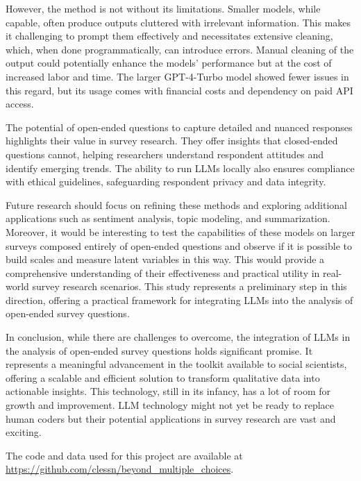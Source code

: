 \documentclass[
  authoryear,
  preprint,
  3p]{elsarticle}
\begin{document}
However, the method is not without its limitations. Smaller models,
while capable, often produce outputs cluttered with irrelevant
information. This makes it challenging to prompt them effectively and
necessitates extensive cleaning, which, when done programmatically, can
introduce errors. Manual cleaning of the output could potentially
enhance the models' performance but at the cost of increased labor and
time. The larger GPT-4-Turbo model showed fewer issues in this regard,
but its usage comes with financial costs and dependency on paid API
access.

The potential of open-ended questions to capture detailed and nuanced
responses highlights their value in survey research. They offer insights
that closed-ended questions cannot, helping researchers understand
respondent attitudes and identify emerging trends. The ability to run
LLMs locally also ensures compliance with ethical guidelines,
safeguarding respondent privacy and data integrity.

Future research should focus on refining these methods and exploring
additional applications such as sentiment analysis, topic modeling, and
summarization. Moreover, it would be interesting to test the
capabilities of these models on larger surveys composed entirely of
open-ended questions and observe if it is possible to build scales and
measure latent variables in this way. This would provide a comprehensive
understanding of their effectiveness and practical utility in real-world
survey research scenarios. This study represents a preliminary step in
this direction, offering a practical framework for integrating LLMs into
the analysis of open-ended survey questions.

In conclusion, while there are challenges to overcome, the integration
of LLMs in the analysis of open-ended survey questions holds significant
promise. It represents a meaningful advancement in the toolkit available
to social scientists, offering a scalable and efficient solution to
transform qualitative data into actionable insights. This technology,
still in its infancy, has a lot of room for growth and improvement. LLM
technology might not yet be ready to replace human coders but their
potential applications in survey research are vast and exciting.

The code and data used for this project are available at
\url{https://github.com/clessn/beyond_multiple_choices}.

\newpage{}


\renewcommand\refname{References}
  
\end{document}
